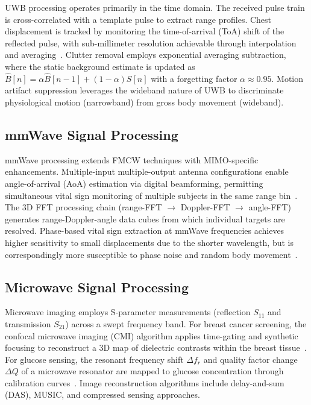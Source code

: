 \documentclass[journal,twoside]{IEEEtran}
\begin{document}
UWB processing operates primarily in the time domain. The received pulse train is cross-correlated with a template pulse to extract range profiles. Chest displacement is tracked by monitoring the time-of-arrival (ToA) shift of the reflected pulse, with sub-millimeter resolution achievable through interpolation and averaging~\cite{ref_uwb_overview2024}. Clutter removal employs exponential averaging subtraction, where the static background estimate is updated as $\hat{B}[n] = \alpha \hat{B}[n-1] + (1-\alpha)S[n]$ with a forgetting factor $\alpha \approx 0.95$. Motion artifact suppression leverages the wideband nature of UWB to discriminate physiological motion (narrowband) from gross body movement (wideband).

\subsection{mmWave Signal Processing}

mmWave processing extends FMCW techniques with MIMO-specific enhancements. Multiple-input multiple-output antenna configurations enable angle-of-arrival (AoA) estimation via digital beamforming, permitting simultaneous vital sign monitoring of multiple subjects in the same range bin~\cite{ref_multipoint2024}. The 3D FFT processing chain (range-FFT $\rightarrow$ Doppler-FFT $\rightarrow$ angle-FFT) generates range-Doppler-angle data cubes from which individual targets are resolved. Phase-based vital sign extraction at mmWave frequencies achieves higher sensitivity to small displacements due to the shorter wavelength, but is correspondingly more susceptible to phase noise and random body movement~\cite{ref_mmwave_vital2025}.

\subsection{Microwave Signal Processing}

Microwave imaging employs S-parameter measurements (reflection $S_{11}$ and transmission $S_{21}$) across a swept frequency band. For breast cancer screening, the confocal microwave imaging (CMI) algorithm applies time-gating and synthetic focusing to reconstruct a 3D map of dielectric contrasts within the breast tissue~\cite{ref_uwb_breast2024}. For glucose sensing, the resonant frequency shift $\Delta f_r$ and quality factor change $\Delta Q$ of a microwave resonator are mapped to glucose concentration through calibration curves~\cite{ref_glucose_dualband2025}. Image reconstruction algorithms include delay-and-sum (DAS), MUSIC, and compressed sensing approaches.
\end{document}

